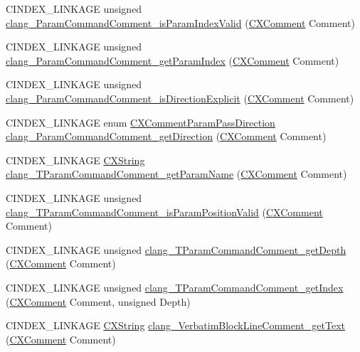 \begin{DoxyCompactItemize}
\item 
C\+I\+N\+D\+E\+X\+\_\+\+L\+I\+N\+K\+A\+GE unsigned \mbox{\hyperlink{group__CINDEX__COMMENT_ga92e6422da2a3e428b4452a3e8955ff76}{clang\+\_\+\+Param\+Command\+Comment\+\_\+is\+Param\+Index\+Valid}} (\mbox{\hyperlink{structCXComment}{C\+X\+Comment}} Comment)
\item 
C\+I\+N\+D\+E\+X\+\_\+\+L\+I\+N\+K\+A\+GE unsigned \mbox{\hyperlink{group__CINDEX__COMMENT_gad9d1dc9ebb52dcc9cb7da8ca4c23332a}{clang\+\_\+\+Param\+Command\+Comment\+\_\+get\+Param\+Index}} (\mbox{\hyperlink{structCXComment}{C\+X\+Comment}} Comment)
\item 
C\+I\+N\+D\+E\+X\+\_\+\+L\+I\+N\+K\+A\+GE unsigned \mbox{\hyperlink{group__CINDEX__COMMENT_gaf68f19e83ca9b27aec7eb22b065620bd}{clang\+\_\+\+Param\+Command\+Comment\+\_\+is\+Direction\+Explicit}} (\mbox{\hyperlink{structCXComment}{C\+X\+Comment}} Comment)
\item 
C\+I\+N\+D\+E\+X\+\_\+\+L\+I\+N\+K\+A\+GE enum \mbox{\hyperlink{group__CINDEX__COMMENT_gafadf6e52217ea74d1a014198df656ee1}{C\+X\+Comment\+Param\+Pass\+Direction}} \mbox{\hyperlink{group__CINDEX__COMMENT_gac78b84734e9e6040a001a0036e6aa15c}{clang\+\_\+\+Param\+Command\+Comment\+\_\+get\+Direction}} (\mbox{\hyperlink{structCXComment}{C\+X\+Comment}} Comment)
\item 
C\+I\+N\+D\+E\+X\+\_\+\+L\+I\+N\+K\+A\+GE \mbox{\hyperlink{structCXString}{C\+X\+String}} \mbox{\hyperlink{group__CINDEX__COMMENT_ga01f61f1d0dabcaf806eb1b9f21e5e340}{clang\+\_\+\+T\+Param\+Command\+Comment\+\_\+get\+Param\+Name}} (\mbox{\hyperlink{structCXComment}{C\+X\+Comment}} Comment)
\item 
C\+I\+N\+D\+E\+X\+\_\+\+L\+I\+N\+K\+A\+GE unsigned \mbox{\hyperlink{group__CINDEX__COMMENT_ga1f6e7538a646824f3dde65d634de753f}{clang\+\_\+\+T\+Param\+Command\+Comment\+\_\+is\+Param\+Position\+Valid}} (\mbox{\hyperlink{structCXComment}{C\+X\+Comment}} Comment)
\item 
C\+I\+N\+D\+E\+X\+\_\+\+L\+I\+N\+K\+A\+GE unsigned \mbox{\hyperlink{group__CINDEX__COMMENT_ga88371156eeeb768d0d14eb5630b7c726}{clang\+\_\+\+T\+Param\+Command\+Comment\+\_\+get\+Depth}} (\mbox{\hyperlink{structCXComment}{C\+X\+Comment}} Comment)
\item 
C\+I\+N\+D\+E\+X\+\_\+\+L\+I\+N\+K\+A\+GE unsigned \mbox{\hyperlink{group__CINDEX__COMMENT_ga0b91d26f02a476076b6dc5b5eea59a8f}{clang\+\_\+\+T\+Param\+Command\+Comment\+\_\+get\+Index}} (\mbox{\hyperlink{structCXComment}{C\+X\+Comment}} Comment, unsigned Depth)
\item 
C\+I\+N\+D\+E\+X\+\_\+\+L\+I\+N\+K\+A\+GE \mbox{\hyperlink{structCXString}{C\+X\+String}} \mbox{\hyperlink{group__CINDEX__COMMENT_ga599fad38a1c52917a2458ac10412969f}{clang\+\_\+\+Verbatim\+Block\+Line\+Comment\+\_\+get\+Text}} (\mbox{\hyperlink{structCXComment}{C\+X\+Comment}} Comment)

\end{DoxyCompactItemize}
